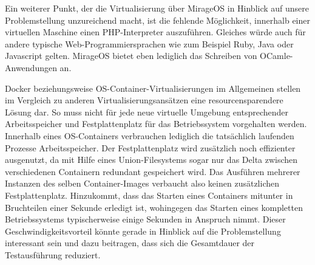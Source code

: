 Ein weiterer Punkt, der die Virtualisierung über MirageOS in Hinblick auf unsere Problemstellung unzureichend macht, ist die fehlende Möglichkeit, innerhalb einer virtuellen Maschine einen PHP-Interpreter auszuführen. Gleiches würde auch für andere typische Web-Programmiersprachen wie zum Beispiel Ruby, Java oder Javascript gelten. MirageOS bietet eben lediglich das Schreiben von OCamle-Anwendungen an.

Docker beziehungsweise OS-Container-Virtualisierungen im Allgemeinen stellen im Vergleich zu anderen Virtualisierungsansätzen eine resourcensparendere Lösung dar. So muss nicht für jede neue virtuelle Umgebung entsprechender Arbeitsspeicher und Festplattenplatz für das Betriebssystem vorgehalten werden. Innerhalb eines OS-Containers verbrauchen lediglich die tatsächlich laufenden Prozesse Arbeitsspeicher. Der Festplattenplatz wird zusätzlich noch effizienter ausgenutzt, da mit Hilfe eines Union-Filesystems sogar nur das Delta zwischen verschiedenen Containern redundant gespeichert wird. Das Ausführen mehrerer Instanzen des selben Container-Images verbaucht also keinen zusätzlichen Festplattenplatz. Hinzukommt, dass das Starten eines Containers mitunter in Bruchteilen einer Sekunde erledigt ist, wohingegen das Starten eines kompletten Betriebssystems typischerweise einige Sekunden in Anspruch nimmt. Dieser Geschwindigkeitsvorteil könnte gerade in Hinblick auf die Problemstellung interessant sein und dazu beitragen, dass sich die Gesamtdauer der Testausführung reduziert.